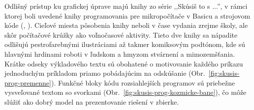 Odlišný prístup ku grafickej úprave majú knihy zo série ,,Skúsiš to s ...'', v rámci ktorej boli uvedené knihy programovania pre mikropočítače v Basicu a strojovom kóde (\cite{tatchellova_skusis_1990}, \cite{wattsova_skusis_1991}). Cieľové miesta pôsobenia knihy neboli v čase vydania zrejme školy, ale skôr počítačové krúžky ako voľnočasové aktivity. Tieto dve knihy sa nápadite odlišujú pestrofarebnými ilustráciami až takmer komiksovým podtónom, kde sú hlavnými hrdinami roboti v ľudskom a hmyzom stvárnení a mimozemšťania. Krátke odseky výkladového textu sú obohatené o motivovanie každého príkazu jednoduchým príkladom priamo pobádajúcim na odskúšanie (Obr.~\ref{fig:skusis-prog-premenne}). Funkčné bloky kódu rozsiahlejších programov sú priebežne vysveľované textom so svorkami (Obr.~\ref{fig:skusis-prog-kozmicke-bane}), čo môže slúžiť ako dobrý model na prezentovanie riešení v zbierke.

